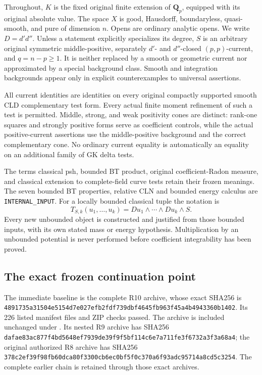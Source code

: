\documentclass[11pt,a4paper]{article}
\numberwithin{equation}{section}
\theoremstyle{definition}
\theoremstyle{remark}
\begin{document}
Throughout, $K$ is the fixed original finite extension of
$\mathbf Q_p$, equipped with its original absolute value.
The space $X$ is good, Hausdorff, boundaryless, quasi-smooth,
and pure of dimension $n$.  Opens are ordinary analytic
opens.  We write $D=d'd''$.
Unless a statement explicitly specializes its degree,
$S$ is an arbitrary original symmetric middle-positive,
separately $d'$- and $d''$-closed $(p,p)$-current, and
$q=n-p\geq1$.
It is neither replaced by a smooth or geometric current
nor approximated by a special background class.
Smooth and integration backgrounds appear only in
explicit counterexamples to universal assertions.

All current identities are identities on every original
compactly supported smooth CLD complementary test form.
Every actual finite moment refinement of such a test
is permitted.  Middle, strong, and weak positivity cones
are distinct: rank-one squares and strongly positive
forms serve as coefficient controls, while the actual
positive-current assertions use the middle-positive
background and the correct complementary cone.
No ordinary current equality is automatically an
equality on an additional family of GK delta tests.

The terms classical psh, bounded BT product, original
coefficient-Radon measure, and classical extension to
complete-field curve tests retain their frozen meanings.
The seven bounded BT properties, relative CLN and
bounded energy calculus are \texttt{INTERNAL\_INPUT}.
For a locally bounded classical tuple the notation is
\[
 T_{S,k}(u_1,\ldots,u_k)
              =Du_1\wedge\cdots\wedge Du_k\wedge S.
 \tag{M1}
\]
Every new unbounded object is constructed and justified
from those bounded inputs, with its own stated mass or
energy hypothesis.  Multiplication by an unbounded
potential is never performed before coefficient
integrability has been proved.

\subsection{The exact frozen continuation point}

The immediate baseline is the complete R10 archive,
whose exact SHA256 is
{\small\nolinkurl{4891735a31504e5154d7e027efb2fdf739dbf4645fb963f45a4b4943360b1402}}.
Its 226 listed manifest files and ZIP checks passed.
The archive is included unchanged under
.
Its nested R9 archive has SHA256
{\small\nolinkurl{dafae83ac877f4bd5648ef7939de39f9f5bf114c6e7a711fe3f6732a3f3a68a4}};
the original authorized R8 archive has SHA256
{\small\nolinkurl{378c2ef39f98fb60dca80f3300cb6ec0bf5f0c370a6f93adc95714a8cd5c3254}}.
The complete earlier chain is retained through those exact archives.
\end{document}
